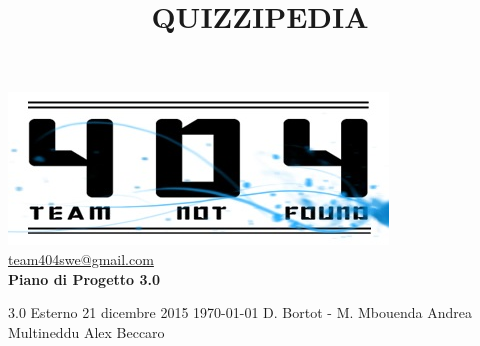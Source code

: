 \documentclass[a4paper,11pt]{article}
\title{\textbf{{\fontsize{10mm}{6mm}\selectfont QUIZZIPEDIA}}}
\begin{document}
	\maketitle
	
	\begin{center}

	\includegraphics{../../team_not_found.jpg}\\	
	\fontsize{5mm}{3mm}\url{team404swe@gmail.com}\\
	\vspace{40mm}
	\textbf{ Piano di Progetto 3.0}
	\end{center}
	\thispagestyle{empty}	%
			{3.0} 							%
			{Esterno} 						%
			{21 dicembre 2015} 				%
			{\today} 						%
			{D. Bortot - M. Mbouenda}		%
			{Andrea Multineddu} 			%
			{Alex Beccaro} 				%
	
	\newpage
	\thispagestyle{empty}
	\null
	
	\newpage
	\fancyfoot[R]{\thepage}
\end{document}
